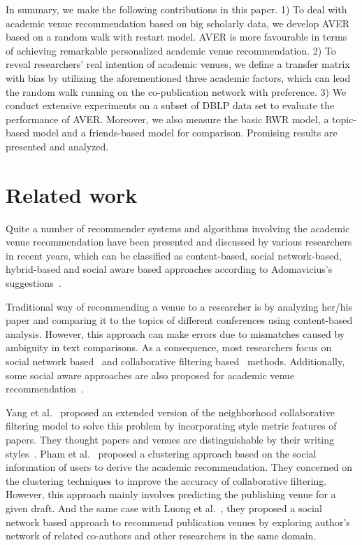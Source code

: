 \documentclass[9pt]{acm_proc_article-sp}
\begin{document}
In summary, we make the following contributions in this paper. 1) To deal with academic venue recommendation based on big scholarly data, we develop AVER based on a random walk with restart model. AVER is more favourable in terms of achieving remarkable personalized academic venue recommendation. 2) To reveal researchers' real intention of academic venues, we define a transfer matrix with bias by utilizing the aforementioned three academic factors, which can lead the random walk running on the co-publication network with preference. 3) We conduct extensive experiments on a subset of DBLP data set to evaluate the performance of AVER. Moreover, we also measure the basic RWR model, a topic-based model and a friends-based model for comparison. Promising results are presented and analyzed.

\section{Related work}
Quite a number of recommender systems and algorithms involving the academic venue recommendation have been presented and discussed by various researchers in recent years, which can be classified as content-based, social network-based, hybrid-based and social aware based approaches according to Adomavicius's suggestions~\cite{adomavicius2005toward}.

Traditional way of recommending a venue to a researcher is by analyzing her/his paper and comparing it to the topics of different conferences using content-based analysis. However, this approach can make errors due to mismatches caused by ambiguity in text comparisons. As a consequence, most researchers focus on social network based~\cite{luong2012publication,chen2012social} and collaborative filtering based~\cite{pham2011clustering,yang2012venue} methods. Additionally, some social aware approaches are also proposed for academic venue recommendation~\cite{asabere2014improving,xia2013socially,hornick2012extending}.

Yang et al.~\cite{yang2012venue} proposed an extended version of the neighborhood collaborative filtering model to solve this problem by incorporating style metric features of papers. They thought papers and venues are distinguishable by their writing styles~\cite{yang2012distinguishing}. Pham et al.~\cite{pham2011clustering} proposed a clustering approach based on the social information of users to derive the academic recommendation. They concerned on the clustering techniques to improve the accuracy of collaborative filtering. However, this approach mainly involves predicting the publishing venue for a given draft. And the same case with Luong et al.~\cite{luong2012publication}, they proposed a social network based approach to recommend publication venues by exploring author's network of related co-authors and other researchers in the same domain.
\end{document}
